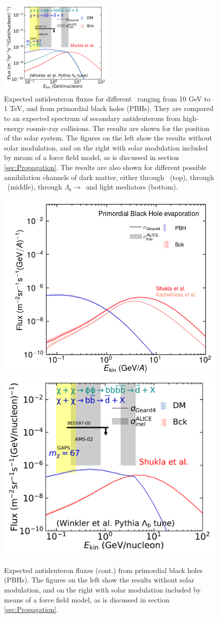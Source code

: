 \begin{figure}[hbtp]
    \includegraphics[width=0.49\textwidth]{figures/antideuteron_lambdaB_TOA.pdf}
    \caption{Expected antideuteron fluxes for different \dmm\ ranging from 10 GeV to 1 TeV, and from primordial black holes (PBHs). They are compared to an expected spectrum of secondary antideuterons from high-energy cosmic-ray collisions. The results are shown for the position of the solar system. The figures on the left show the results without solar modulation, and on the right with solar modulation included by means of a force field model, as is discussed in section \ref{sec:Propagation}. The results are also shown for different possible annihilation channels of dark matter, either through \WW\ (top), through \bb\ (middle), through $\Lambda_b \rightarrow $\bb\ and light mediators (bottom).}
    \label{fig:Results_dbar_fluxes_diff_DM_masses}
\end{figure}
\begin{figure}\ContinuedFloat
    \centering
    \includegraphics[width=.49\textwidth]{figures/antideuteron_fluxes_PBH_LIS.png}
    \includegraphics[width=.49\textwidth]{figures/antideuteron_TOA_LambdaB.pdf}
    \caption{Expected antideuteron fluxes (cont.) from primordial black holes (PBHs). The figures on the left show the results without solar modulation, and on the right with solar modulation included by means of a force field model, as is discussed in section \ref{sec:Propagation}.}
    \label{fig:Results_dbar_fluxes_diff_DM_masses}
\end{figure}

